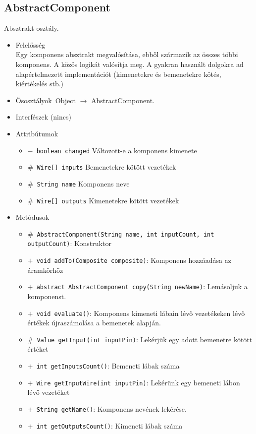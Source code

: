 \subsection{AbstractComponent}
Absztrakt osztály.
\begin{itemize}
\item Felelősség\\
Egy komponens absztrakt megvalósítása, ebből származik az összes többi  komponens. A közös logikát valósítja meg. A gyakran használt dolgokra  ad alapértelmezett implementációt (kimenetekre és bemenetekre kötés, kiértékelés stb.)
\item Ősosztályok\ Object $\rightarrow{}$ AbstractComponent.
\item Interfészek (nincs)
\item Attribútumok $\ $
\begin{itemize}
	\item[] \texttt{$-$ boolean changed} Változott-e a komponens kimenete
	\item[] \texttt{$\#$ Wire[] inputs} Bemenetekre kötött vezetékek
	\item[] \texttt{$\#$ String name} Komponens neve
	\item[] \texttt{$\#$ Wire[] outputs} Kimenetekre kötött vezetékek
\end{itemize}
\item Metódusok$\ $
\begin{itemize}
	\item[] \texttt{$\#$ AbstractComponent(String name, int inputCount, int outputCount)}: Konstruktor
	\item[] \texttt{$+$ void addTo(Composite composite)}: Komponens hozzáadása az áramkörhöz
	\item[] \texttt{$+$ abstract AbstractComponent copy(String newName)}: Lemásoljuk a komponenst.
	\item[] \texttt{$+$ void evaluate()}: Komponens kimeneti lábain lévő vezetékeken lévő értékek újraszámolása  a bemenetek alapján.
	\item[] \texttt{$\#$ Value getInput(int inputPin)}: Lekérjük egy adott bemenetre kötött értéket
	\item[] \texttt{$+$ int getInputsCount()}: Bemeneti lábak száma
	\item[] \texttt{$+$ Wire getInputWire(int inputPin)}: Lekérünk egy bemeneti lábon lévő vezetéket
	\item[] \texttt{$+$ String getName()}: Komponens nevének lekérése.
	\item[] \texttt{$+$ int getOutputsCount()}: Kimeneti lábak száma

\end{itemize}
\end{itemize}

